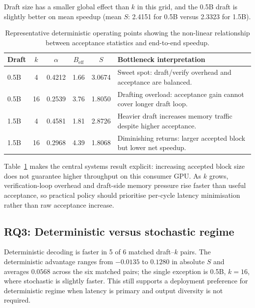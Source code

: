 Draft size has a smaller global effect than $k$ in this grid, and the 0.5B
draft is slightly better on mean speedup (mean $S$: 2.4151 for 0.5B versus
2.3323 for 1.5B).

\begin{table}[t]
\centering
\caption{Representative deterministic operating points showing the non-linear
relationship between acceptance statistics and end-to-end speedup.}
\label{tab:core-bottleneck}
\small
\begin{tabular}{l c c c c l}
\hline
\textbf{Draft} & $k$ & $\alpha$ & $B_{\text{eff}}$ & $S$ & \textbf{Bottleneck interpretation} \\
\hline
0.5B & 4  & 0.4212 & 1.66 & 3.0674 & Sweet spot: draft/verify overhead and acceptance are balanced. \\
0.5B & 16 & 0.2539 & 3.76 & 1.8050 & Drafting overload: acceptance gain cannot cover longer draft loop. \\
1.5B & 4  & 0.4581 & 1.81 & 2.8726 & Heavier draft increases memory traffic despite higher acceptance. \\
1.5B & 16 & 0.2968 & 4.39 & 1.8068 & Diminishing returns: larger accepted block but lower net speedup. \\
\hline
\end{tabular}
\end{table}

Table~\ref{tab:core-bottleneck} makes the central systems result explicit:
increasing accepted block size does not guarantee higher throughput on this
consumer GPU. As $k$ grows, verification-loop overhead and draft-side memory
pressure rise faster than useful acceptance, so practical policy should
prioritise per-cycle latency minimisation rather than raw acceptance increase.

\subsection{RQ3: Deterministic versus stochastic regime}

Deterministic decoding is faster in 5 of 6 matched draft--$k$ pairs. The
deterministic advantage ranges from $-0.0135$ to $0.1280$ in absolute $S$ and
averages $0.0568$ across the six matched pairs; the single exception is
0.5B, $k{=}16$, where stochastic is slightly faster. This still supports a
deployment preference for deterministic regime when latency is primary and
output diversity is not required.

